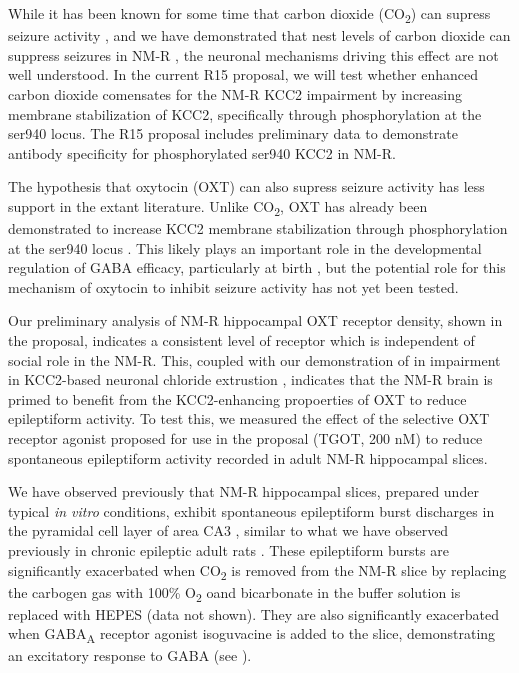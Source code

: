 \documentclass[11pt]{nih}
\begin{document}
\par While it has been known for some time that carbon dioxide (CO\textsubscript{2}) can supress seizure activity \cite{petroianu_2020_singultus}, and we have demonstrated that nest levels of carbon dioxide can suppress seizures in NM-R \cite{zions_2020_nest}, the neuronal mechanisms driving this effect are not well understood. In the current R15 proposal, we will test whether enhanced carbon dioxide comensates for the NM-R KCC2 impairment by increasing membrane stabilization of KCC2, specifically through phosphorylation at the ser940 locus.  The R15 proposal includes preliminary data to demonstrate antibody specificity for phosphorylated ser940 KCC2 in NM-R.
\par The hypothesis that oxytocin (OXT) can also supress seizure activity has less support in the extant literature. Unlike CO\textsubscript{2}, OXT has already been demonstrated to increase KCC2 membrane stabilization through phosphorylation at the ser940 locus \cite{leonzino_2016_timing}.  This likely plays an important role in the developmental regulation of GABA efficacy, particularly at birth \cite{tyzio_2006_maternal}, but the potential role for this mechanism of oxytocin to inhibit seizure activity has not yet been tested. 
\par Our preliminary analysis of NM-R hippocampal OXT receptor density, shown in the proposal, indicates a consistent level of receptor which is independent of social role in the NM-R. This, coupled with our demonstration of in impairment in KCC2-based neuronal chloride extrustion \cite{zions_2020_nest}, indicates that the NM-R brain is primed to benefit from the KCC2-enhancing propoerties of OXT \cite{leonzino_2016_timing} to reduce epileptiform activity. To test this, we measured the effect of the selective OXT receptor agonist proposed for use in the proposal (TGOT, 200 nM) to reduce spontaneous epileptiform activity recorded in adult NM-R hippocampal slices. 
\par We have observed previously that NM-R hippocampal slices, prepared under typical \textit{in vitro} conditions, exhibit spontaneous epileptiform burst discharges in the pyramidal cell layer of area CA3 \cite{zions_2020_nest}, similar to what we have observed previously in chronic epileptic adult rats \cite{McCloskey2011-sm}. These epileptiform bursts are significantly exacerbated when CO\textsubscript{2} is removed from the NM-R slice by replacing the carbogen gas with 100\% O\textsubscript{2} oand bicarbonate in the buffer solution is replaced with HEPES (data not shown). They are also significantly exacerbated when GABA\textsubscript{A} receptor agonist isoguvacine is added to the slice, demonstrating an excitatory response to GABA (see \cite{zions_2020_nest}).
\end{document}
